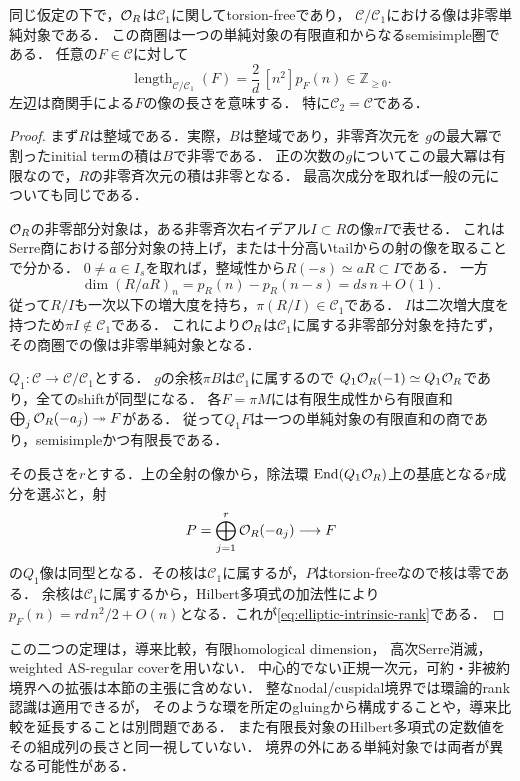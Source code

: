 \begin{theorem}[内在的rankと反標準増大度]\label{thm:elliptic-rank}
同じ仮定の下で，$\mathcal O_R$は$\mathcal C_1$に関してtorsion-freeであり，
$\mathcal C/\mathcal C_1$における像は非零単純対象である．
この商圏は一つの単純対象の有限直和からなるsemisimple圏である．
任意の$F\in\mathcal C$に対して
\begin{equation}\label{eq:elliptic-intrinsic-rank}
 \operatorname{length}_{\mathcal C/\mathcal C_1}(F)
 =\frac{2}{d}\,[n^2]p_F(n)\in\mathbb Z_{\geq0}.
\end{equation}
左辺は商関手による$F$の像の長さを意味する．
特に$\mathcal C_2=\mathcal C$である．
\end{theorem}
\begin{proof}
まず$R$は整域である．実際，$B$は整域であり，非零斉次元を
$g$の最大冪で割ったinitial termの積は$B$で非零である．
正の次数の$g$についてこの最大冪は有限なので，$R$の非零斉次元の積は非零となる．
最高次成分を取れば一般の元についても同じである．

$\mathcal O_R$の非零部分対象は，ある非零斉次右イデアル$I\subset R$の像$\pi I$で表せる．
これはSerre商における部分対象の持上げ，または十分高いtailからの射の像を取ることで分かる．
$0\ne a\in I_s$を取れば，整域性から$R(-s)\simeq aR\subset I$である．
一方
\[
 \dim(R/aR)_n=p_R(n)-p_R(n-s)=ds\,n+O(1).
\]
従って$R/I$も一次以下の増大度を持ち，$\pi(R/I)\in\mathcal C_1$である．
$I$は二次増大度を持つため$\pi I\notin\mathcal C_1$である．
これにより$\mathcal O_R$は$\mathcal C_1$に属する非零部分対象を持たず，
その商圏での像は非零単純対象となる．

$Q_1:\mathcal C\to\mathcal C/\mathcal C_1$とする．
$g$の余核$\pi B$は$\mathcal C_1$に属するので
$Q_1\mathcal O_R(-1)\simeq Q_1\mathcal O_R$であり，全てのshiftが同型になる．
各$F=\pi M$には有限生成性から有限直和$\bigoplus_j\mathcal O_R(-a_j)\twoheadrightarrow F$がある．
従って$Q_1F$は一つの単純対象の有限直和の商であり，semisimpleかつ有限長である．

その長さを$r$とする．上の全射の像から，除法環
$\operatorname{End}(Q_1\mathcal O_R)$上の基底となる$r$成分を選ぶと，射
\[
 P=\bigoplus_{j=1}^{r}\mathcal O_R(-a_j)\longrightarrow F
\]
の$Q_1$像は同型となる．その核は$\mathcal C_1$に属するが，$P$はtorsion-freeなので核は零である．
余核は$\mathcal C_1$に属するから，Hilbert多項式の加法性により
$p_F(n)=rd\,n^2/2+O(n)$となる．これが\eqref{eq:elliptic-intrinsic-rank}である．
\end{proof}

\begin{remark}[仮定と適用範囲]
この二つの定理は，導来比較，有限homological dimension，
高次Serre消滅，weighted AS-regular coverを用いない．
中心的でない正規一次元，可約・非被約境界への拡張は本節の主張に含めない．
整なnodal/cuspidal境界では環論的rank認識は適用できるが，
そのような環を所定のgluingから構成することや，導来比較を延長することは別問題である．
また有限長対象のHilbert多項式の定数値をその組成列の長さと同一視していない．
境界の外にある単純対象では両者が異なる可能性がある．
\end{remark}

